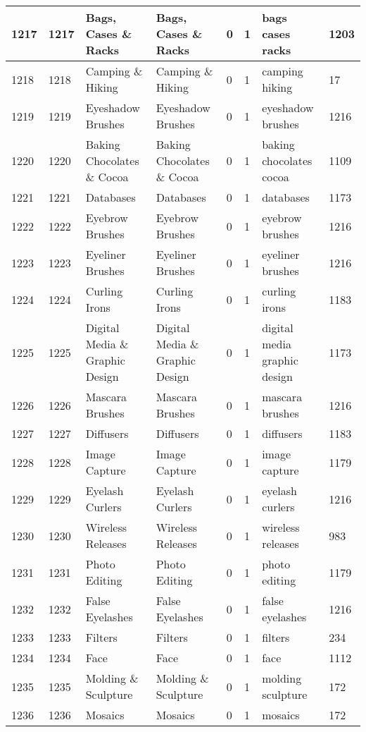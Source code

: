 \begin{longtable}{|l|l|l|l|l|l|l|l|}
1217 & 1217 & Bags, Cases \& Racks & Bags, Cases \& Racks & 0 & 1 & bags cases racks & 1203 \\ \hline 
1218 & 1218 & Camping \& Hiking & Camping \& Hiking & 0 & 1 & camping hiking & 17 \\ \hline 
1219 & 1219 & Eyeshadow Brushes & Eyeshadow Brushes & 0 & 1 & eyeshadow brushes & 1216 \\ \hline 
1220 & 1220 & Baking Chocolates \& Cocoa & Baking Chocolates \& Cocoa & 0 & 1 & baking chocolates cocoa & 1109 \\ \hline 
1221 & 1221 & Databases & Databases & 0 & 1 & databases & 1173 \\ \hline 
1222 & 1222 & Eyebrow Brushes & Eyebrow Brushes & 0 & 1 & eyebrow brushes & 1216 \\ \hline 
1223 & 1223 & Eyeliner Brushes & Eyeliner Brushes & 0 & 1 & eyeliner brushes & 1216 \\ \hline 
1224 & 1224 & Curling Irons & Curling Irons & 0 & 1 & curling irons & 1183 \\ \hline 
1225 & 1225 & Digital Media \& Graphic Design & Digital Media \& Graphic Design & 0 & 1 & digital media graphic design & 1173 \\ \hline 
1226 & 1226 & Mascara Brushes & Mascara Brushes & 0 & 1 & mascara brushes & 1216 \\ \hline 
1227 & 1227 & Diffusers & Diffusers & 0 & 1 & diffusers & 1183 \\ \hline 
1228 & 1228 & Image Capture & Image Capture & 0 & 1 & image capture & 1179 \\ \hline 
1229 & 1229 & Eyelash Curlers & Eyelash Curlers & 0 & 1 & eyelash curlers & 1216 \\ \hline 
1230 & 1230 & Wireless Releases & Wireless Releases & 0 & 1 & wireless releases & 983 \\ \hline 
1231 & 1231 & Photo Editing & Photo Editing & 0 & 1 & photo editing & 1179 \\ \hline 
1232 & 1232 & False Eyelashes & False Eyelashes & 0 & 1 & false eyelashes & 1216 \\ \hline 
1233 & 1233 & Filters & Filters & 0 & 1 & filters & 234 \\ \hline 
1234 & 1234 & Face & Face & 0 & 1 & face & 1112 \\ \hline 
1235 & 1235 & Molding \& Sculpture & Molding \& Sculpture & 0 & 1 & molding sculpture & 172 \\ \hline 
1236 & 1236 & Mosaics & Mosaics & 0 & 1 & mosaics & 172 \\ \hline 

\end{longtable}
